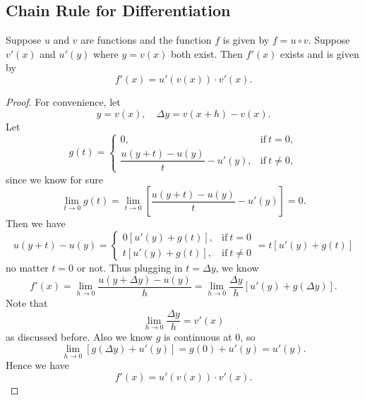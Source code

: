 \documentclass[a4paper]{ctexart}
\begin{document}
	\subsection{Chain Rule for Differentiation}
	\begin{mythm}
		Suppose $u$ and $v$ are functions and the function $f$ is given by
		$f=u\circ v$. Suppose $v'(x)$ and $u'(y)$ where $y=v(x)$ both exist. Then $f'(x)$ exists and is given by
		\[
		f'(x) = u'(v(x)) \cdot v'(x).
		\]
	\end{mythm}
	\begin{proof}
		For convenience, let
		\[
		y=v(x),\quad \Delta y = v(x+h) - v(x).
		\]
		Let
		\[
		g(t)= 
		\begin{cases}
		0, & \text{if}\ t=0,\\[6pt]
		\dfrac{u(y+t) - u(y)}{t}-u'(y), & \text{if}\ t\neq 0,
		\end{cases}
		\]
		since we know for sure
		\[
		\lim_{t\to 0} g(t) = \lim_{t\to 0} \left[ \frac{u(y+t) - u(y)}{t} - u'(y) \right]=0.
		\]
		Then we have
		\[
		u(y+t)-u(y)=
		\begin{cases}
		0\left[u'(y) + g(t)\right], & \text{if}\ t=0\\[6pt]
		t\left[u'(y) + g(t)\right], & \text{if}\ t\neq 0
		\end{cases}
		= t\left[u'(y) + g(t)\right]
		\]
		no matter $t=0$ or not. Thus plugging in $t=\Delta y$, we know
		\[
		f'(x)=\lim_{h\to 0} \frac{u(y + \Delta y) - u(y)}{h} = \lim_{h\to 0} \frac{\Delta y}{h} \left[u'(y) + g(\Delta y)\right].
		\]
		Note that
		\[
		\lim_{h\to 0} \frac{\Delta y}{h}=v'(x)
		\]
		as discussed before. Also we know $g$ is continuous at $0$, so
		\[
		\lim_{h\to 0} \left[g(\Delta y)+ u'(y)\right] = g(0) + u'(y) = u'(y).
		\]
		Hence we have
		\[
		f'(x) = u'(v(x)) \cdot v'(x).
		\]
	\end{proof}
\end{document}
